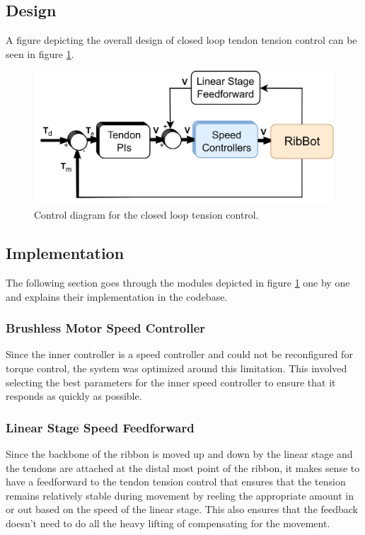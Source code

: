 \subsection{Design}
A figure depicting the overall design of closed loop tendon tension control can be seen in figure \ref{fig:tensioncontrol}.
\begin{figure} [H]
    \centering
    \includegraphics[width=0.7\linewidth]{images/tensioncontrol.png}
    \caption{Control diagram for the closed loop tension control.}
    \label{fig:tensioncontrol}
\end{figure}


\subsection{Implementation}
The following section goes through the modules depicted in figure \ref{fig:tensioncontrol} one by one and explains their implementation in the codebase.

\subsubsection{Brushless Motor Speed Controller}
Since the inner controller is a speed controller and could not be reconfigured for torque control, the system was optimized around this limitation. This involved selecting the best parameters for the inner speed controller to ensure that it responds as quickly as possible.  

\subsubsection{Linear Stage Speed Feedforward}
Since the backbone of the ribbon is moved up and down by the linear stage and the tendons are attached at the distal most point of the ribbon, it makes sense to have a feedforward to the tendon tension control that ensures that the tension remains relatively stable during movement by reeling the appropriate amount in or out based on the speed of the linear stage. This also ensures that the feedback doesn't need to do all the heavy lifting of compensating for the movement.

